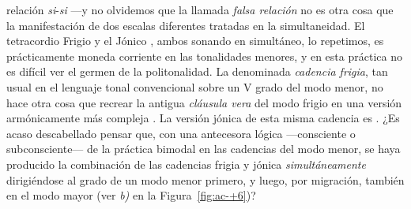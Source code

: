 \documentclass[a4paper,10pt]{article}
\begin{document}
\begin{multicols}{2}
relación \emph{si\bemoltxt}-\emph{si\becuadrotxt} ---y no olvidemos que la llamada \emph{falsa relación} no es otra cosa que la manifestación de dos escalas diferentes tratadas en la simultaneidad. El tetracordio Frigio  y el Jónico \hbox{,} ambos sonando en simultáneo, lo repetimos, es prácticamente moneda corriente en las tonalidades menores, y en esta práctica no es difícil ver el germen de la politonalidad. La denominada \emph{cadencia frigia}, tan usual en el lenguaje tonal convencional sobre un V grado del modo menor, no hace otra cosa que recrear la antigua \emph{cláusula vera} del modo frigio  en una versión armónicamente más compleja \hbox{.} La versión jónica de esta misma cadencia es \hbox{.} ¿Es acaso descabellado pensar que, con una antecesora lógica ---consciente o subconsciente--- de la práctica bimodal en las cadencias del modo menor, se haya producido la combinación de las cadencias frigia y jónica \emph{simultáneamente} dirigiéndose al  grado de un modo menor primero, y luego, por migración, también en el modo mayor (ver \emph{b)} en la Figura~\ref{fig:ac-+6})?
\end{multicols}
\end{document}
